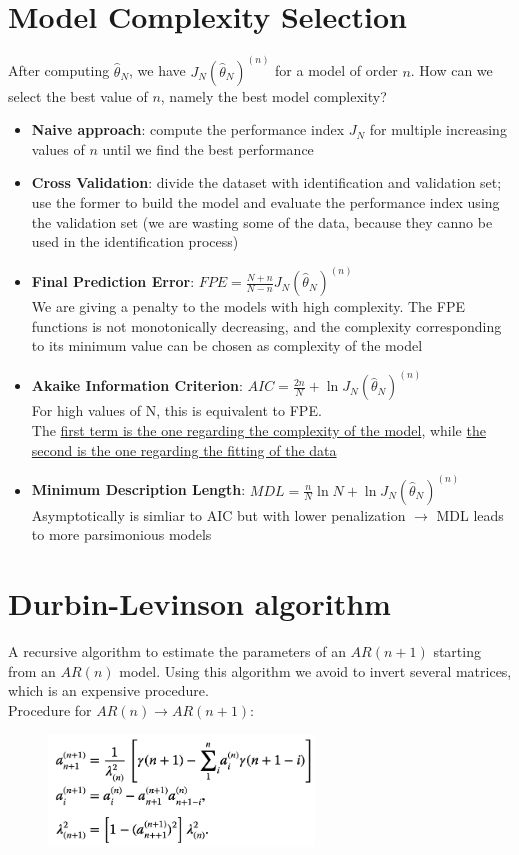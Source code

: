 \documentclass[10pt,a4paper]{article}
\begin{document}
\section{Model Complexity Selection}
After computing $\hat{\theta}_N$, we have $J_N(\hat{\theta}_N)^{(n)}$ for a model of order $n$. How can we select the best value of $n$, namely the best model complexity?
\begin{itemize}
	\item \textbf{Naive approach}: compute the performance index $J_N$ for multiple increasing values of $n$ until we find the best performance
	\item \textbf{Cross Validation}: divide the dataset with identification and validation set; use the former to build the model and evaluate the performance index using the validation set (we are wasting some of the data, because they canno be used in the identification process)
	\item \textbf{Final Prediction Error}: $FPE=\frac{N+n}{N-n}J_N(\hat{\theta}_N)^{(n)}$ \\
	We are giving a penalty to the models with high complexity. The FPE functions is not monotonically decreasing, and the complexity corresponding to its minimum value can be chosen as complexity of the model
	\item \textbf{Akaike Information Criterion}: $AIC=\frac{2n}{N}+\ln{J_N(\hat{\theta}_N)^{(n)}}$ \\ For high values of N, this is equivalent to FPE. \\ The \uline{first term is the one regarding the complexity of the model}, while \uline{the second is the one regarding the fitting of the data}
	\item \textbf{Minimum Description Length}: $MDL=\frac{n}{N}\ln{N}+\ln{J_N(\hat{\theta}_N)^{(n)}}$ \\
	Asymptotically is simliar to AIC but with lower penalization $\rightarrow$ MDL leads to more parsimonious models
\end{itemize}
\section{Durbin-Levinson algorithm}
A recursive algorithm to estimate the parameters of an $AR(n+1)$ starting from an $AR(n)$ model. Using this algorithm we avoid to invert several matrices, which is an expensive procedure. \\
Procedure for $AR(n) \rightarrow AR(n+1)$:
 \begin{figure}[h!]
 \hfill \includegraphics[width=200pt]{images/durbin.png}\hspace*{\fill}
  \label{fig:durbin}
\end{figure} 
\end{document}
